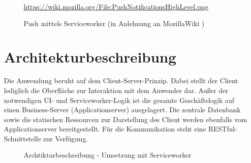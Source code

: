 \begin{figure}[htp] 
\caption{Push mittels Serviceworker (in Anlehnung an MozillaWiki \cite{MOZ_WIKI})}
\quelle\url{https://wiki.mozilla.org/File:PushNotificationsHighLevel.png}
\label{image_architektur-serviceworker-push}
\end{figure}  



\newpage
\section{Architekturbeschreibung}
\label{sec_konzeption_serviceworker_architektur}

Die Anwendung beruht auf dem Client-Server-Prinzip. Dabei stellt der Client lediglich die Oberfläche zur Interaktion mit dem Anwender dar. Außer der notwendigen UI- und Serviceworker-Logik ist die gesamte Geschäftslogik auf einen Business-Server (Applicationserver) ausgelagert. Die zentrale Datenbank sowie die statischen Ressourcen zur Darstellung des Client werden ebenfalls vom Applicationserver bereitgestellt. Für die Kommunikation steht eine RESTful-Schnittstelle zur Verfügung.

\begin{figure}[htp] 
\caption{Archtikturbeschreibung - Umsetzung mit Serviceworker}
\label{image_architektur-serviceworker-push}
\end{figure} 

